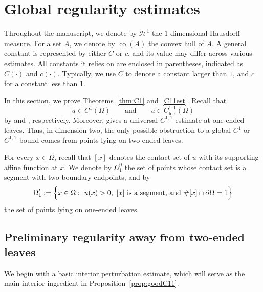 \documentclass[reqno,11pt]{amsart}
\def\dist{{\mathop\mathrm{dist}}}
\numberwithin{equation}{section}
\theoremstyle{remark}
\begin{document}
\section{Global regularity estimates}\label{sec2}

Throughout the manuscript, we denote by $\mathscr H^{1}$ the $1$-dimensional Hausdorff measure. For a set $A$, we denote by $\operatorname{co}(A)$ the convex hull of $A$. A general constant is represented by either $C$ or $c$, and its value may differ across various estimates. All constants it relies on are enclosed in parentheses, indicated as $C(\cdot)$ and $c(\cdot)$. Typically, we use 
$C$ to denote a constant larger than $1$, and $c$ for a constant less than $1$. 


In this section, we prove Theorems~\ref{thm:C1} and~\ref{C11est}.
Recall that
\[
u\in C^1(\Omega)
\qquad\text{and}\qquad
u\in C^{1,1}_{\mathrm{loc}}(\Omega)
\]
by \cite[Theorem~2.2]{CL2001} and \cite{CL2006}, respectively.
Moreover, \cite[Theorem~4.1]{MRZ20252} gives a universal $C^{1,1}$ estimate at one-ended leaves.
Thus, in dimension two, the only possible obstruction to a global $C^1$ or $C^{1,1}$ bound comes from points lying on two-ended leaves.

For every $x\in\Omega$, recall that $[x]$ denotes the contact set of
$u$ with its supporting affine function at $x$. We denote by $\Omega_1^0$ the
set of points whose contact set is a segment with two boundary endpoints, and by
\[
\Omega_1':=\Bigl\{x\in\Omega:\ u(x)>0,\ [x]\ \text{is a segment, and }
\#[x]\cap\partial\Omega=1\Bigr\}
\]
the set of points lying on one-ended leaves.

\subsection{Preliminary regularity away from two-ended leaves}


 We begin with a basic interior perturbation estimate, which will serve as the main interior ingredient in Proposition~\ref{prop:goodC11}.
\end{document}
